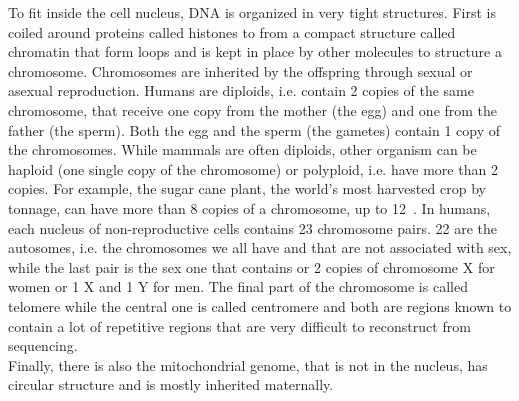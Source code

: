 
To fit inside the cell nucleus, DNA is organized in very tight structures. First is coiled around proteins called histones to from a compact structure called chromatin that form loops and is kept in place by other molecules to structure a chromosome. Chromosomes are inherited by the offspring through sexual or asexual reproduction. Humans are diploids, i.e. contain 2 copies of the same chromosome, that receive one copy from the mother (the egg) and one from the father (the sperm). Both the egg and the sperm (the gametes) contain 1 copy of the chromosomes. While mammals are often diploids, other organism can be haploid (one single copy of the chromosome) or polyploid, i.e. have more than 2 copies. For example, the sugar cane plant, the world's most harvested crop by tonnage, can have more than 8 copies of a chromosome, up to 12~\cite{sugarcane}.
In humans, each nucleus of non-reproductive cells contains 23 chromosome pairs. 22 are the autosomes, i.e. the chromosomes we all have and that are not associated with sex, while the last pair is the sex one that contains or 2 copies of chromosome X for women or 1 X and 1 Y for men. The final part of the chromosome is called telomere while the central one is called centromere and both are regions known to contain a lot of repetitive regions that are very difficult to reconstruct from sequencing. \\ Finally, there is also the mitochondrial genome, that is not in the nucleus, has circular structure and is mostly inherited maternally.

